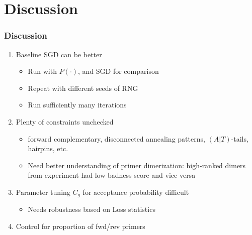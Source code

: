 \documentclass[xcolor=dvipsnames,envcountsect]{beamer}
\begin{document}
\section{Discussion}
\begin{frame}\frametitle{Discussion}
\begin{enumerate}
    \item Baseline SGD can be better
    \begin{itemize}
        \item Run with $P(\cdot)$, and SGD for comparison
        \item Repeat with different seeds of RNG
        \item Run sufficiently many iterations
    \end{itemize}
    \item Plenty of constraints unchecked
    \begin{itemize}
    \item forward complementary, disconnected annealing patterns, $(A|T)$-tails, hairpins, etc.
    \item Need better understanding of primer dimerization: high-ranked dimers from experiment had low badness score and vice versa %
    \end{itemize}
    \item Parameter tuning $C_g$ for acceptance probability difficult
    \begin{itemize}
        \item Needs robustness based on Loss statistics
    \end{itemize}
    \item Control for proportion of fwd/rev primers
\end{enumerate}
\end{frame}
\end{document}
